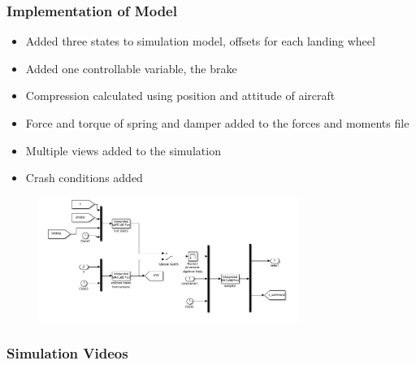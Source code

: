 \documentclass[10pt]{beamer}
\begin{document}
\begin{frame}
  \frametitle{Implementation of Model}
  \begin{itemize}
  \item Added three states to simulation model, offsets for each landing wheel
  \item Added one controllable variable, the brake
  \item Compression calculated using position and attitude of aircraft
  \item Force and torque of spring and damper added to the forces and moments file
  \item Multiple views added to the simulation
  \item Crash conditions added
  \end{itemize}
  
  \begin{figure}[h]
    \includegraphics[width=0.75\textwidth]{img/simulinkDiag.png}
  \end{figure}
\end{frame}

\begin{frame}
  \frametitle{Simulation Videos}
\end{frame}
\end{document}
